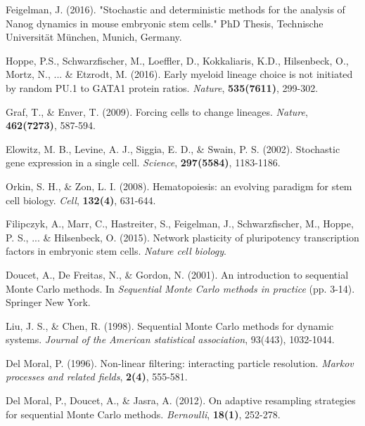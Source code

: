 \documentclass{bioinfo}
\begin{document}
\vspace*{15pt}

\begin{thebibliography}{}

Feigelman, J. (2016). "Stochastic and deterministic methods for the analysis of Nanog dynamics in mouse embryonic stem cells." PhD Thesis, Technische Universit\"at M\"unchen, Munich, Germany.\vspace*{-2pt}

Hoppe, P.S., Schwarzfischer, M., Loeffler, D.,  Kokkaliaris, K.D., Hilsenbeck, O., Mortz, N., ... \& Etzrodt, M. (2016). Early myeloid lineage choice is not initiated by random PU.1 to GATA1 protein ratios. \textit{Nature}, \textbf{535(7611)}, 299-302.

Graf, T., \& Enver, T. (2009). Forcing cells to change lineages. \textit{Nature}, \textbf{462(7273)}, 587-594.

Elowitz, M. B., Levine, A. J., Siggia, E. D., \& Swain, P. S. (2002). Stochastic gene expression in a single cell. \textit{Science}, \textbf{297(5584)}, 1183-1186.

Orkin, S. H., \& Zon, L. I. (2008). Hematopoiesis: an evolving paradigm for stem cell biology. \textit{Cell}, \textbf{132(4)}, 631-644.

Filipczyk, A., Marr, C., Hastreiter, S., Feigelman, J., Schwarzfischer, M., Hoppe, P. S., ... \& Hilsenbeck, O. (2015). Network plasticity of pluripotency transcription factors in embryonic stem cells. \textit{Nature cell biology}.

Doucet, A., De Freitas, N., \& Gordon, N. (2001). An introduction to sequential Monte Carlo methods. In \textit{Sequential Monte Carlo methods in practice} (pp. 3-14). Springer New York.

Liu, J. S., \& Chen, R. (1998). Sequential Monte Carlo methods for dynamic systems. \textit{Journal of the American statistical association}, 93(443), 1032-1044.

Del Moral, P. (1996). Non-linear filtering: interacting particle resolution. \textit{Markov processes and related fields}, \textbf{2(4)}, 555-581.

Del Moral, P., Doucet, A., \& Jasra, A. (2012). On adaptive resampling strategies for sequential Monte Carlo methods. \textit{Bernoulli}, \textbf{18(1)}, 252-278.


\end{thebibliography}
\end{document}

